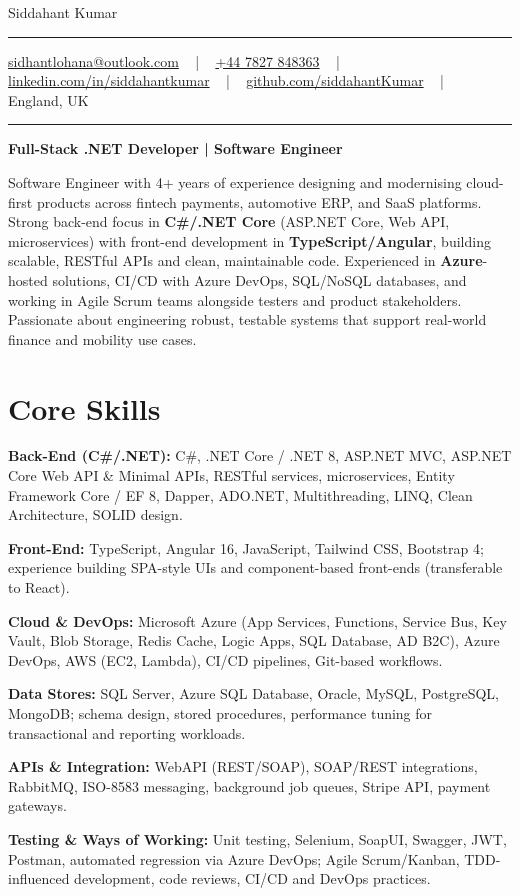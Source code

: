 \documentclass[letterpaper,10pt]{article}
\newcommand{\documentTitle}[2]{
  \begin{center}
    \vspace*{-0.3in}
    {\Huge\color{accentTitle} #1}
    \vspace{8pt}
    {\color{accentLine} \hrule}
    \vspace{2pt}
    \footnotesize{#2}
    \vspace{2pt}
    {\color{accentLine} \hrule}
  \end{center}
}
\newenvironment{resume_list}{
  \vspace{-7pt}
  \begin{itemize}[itemsep=-2px, parsep=1pt, leftmargin=30pt]
}{
  \end{itemize}
}
\begin{document}
\documentTitle{Siddahant Kumar}{
\vspace{0.1cm}
\href{mailto:sidhantlohana@outlook.com}{sidhantlohana@outlook.com} ~ | ~
\href{tel:+447827848363}{+44 7827 848363} ~ | ~
\href{https://www.linkedin.com/in/siddahantkumar/}{linkedin.com/in/siddahantkumar} ~ | ~
\href{https://github.com/siddahantKumar}{github.com/siddahantKumar} ~ | ~
England, UK
}

\begin{center}
\textbf{Full-Stack .NET Developer | Software Engineer}
\end{center}

Software Engineer with 4+ years of experience designing and modernising cloud-first products across fintech payments, automotive ERP, and SaaS platforms. Strong back-end focus in \textbf{C\#/.NET Core} (ASP.NET Core, Web API, microservices) with front-end development in \textbf{TypeScript/Angular}, building scalable, RESTful APIs and clean, maintainable code. Experienced in \textbf{Azure}-hosted solutions, CI/CD with Azure DevOps, SQL/NoSQL databases, and working in Agile Scrum teams alongside testers and product stakeholders. Passionate about engineering robust, testable systems that support real-world finance and mobility use cases.


\section{Core Skills}

\begin{resume_list}
    \item \textbf{Back-End (C\#/.NET):} C\#, .NET Core / .NET 8, ASP.NET MVC, ASP.NET Core Web API \& Minimal APIs, RESTful services, microservices, Entity Framework Core / EF 8, Dapper, ADO.NET, Multithreading, LINQ, Clean Architecture, SOLID design.
    \item \textbf{Front-End:} TypeScript, Angular 16, JavaScript, Tailwind CSS, Bootstrap 4; experience building SPA-style UIs and component-based front-ends (transferable to React).
    \item \textbf{Cloud \& DevOps:} Microsoft Azure (App Services, Functions, Service Bus, Key Vault, Blob Storage, Redis Cache, Logic Apps, SQL Database, AD B2C), Azure DevOps, AWS (EC2, Lambda), CI/CD pipelines, Git-based workflows.
    \item \textbf{Data Stores:} SQL Server, Azure SQL Database, Oracle, MySQL, PostgreSQL, MongoDB; schema design, stored procedures, performance tuning for transactional and reporting workloads.
    \item \textbf{APIs \& Integration:} WebAPI (REST/SOAP), SOAP/REST integrations, RabbitMQ, ISO-8583 messaging, background job queues, Stripe API, payment gateways.
    \item \textbf{Testing \& Ways of Working:} Unit testing, Selenium, SoapUI, Swagger, JWT, Postman, automated regression via Azure DevOps; Agile Scrum/Kanban, TDD-influenced development, code reviews, CI/CD and DevOps practices.
\end{resume_list}
\end{document}
